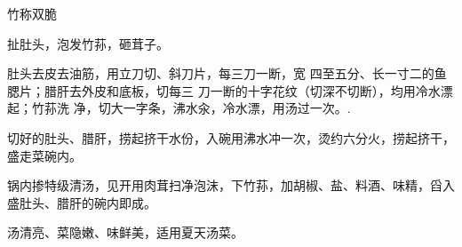 \begin{recipe}{竹称双脆}

\ingredients



\cooking

\step 扯肚头，泡发竹荪，砸茸子。

肚头去皮去油筋，用立刀切、斜刀片，每三刀一断，宽 四至五分、长一寸二的鱼腮片；腊肝去外皮和底板，切每三 刀一断的十字花纹（切深不切断），均用冷水漂起；竹荪洗 净，切大一字条，沸水汆，冷水漂，用汤过一次。.

\step 切好的肚头、腊肝，捞起挤干水份，入碗用沸水冲一次，烫约六分火，捞起挤干，盛走菜碗内。

\step 锅内掺特级清汤，见开用肉茸扫净泡沫，下竹荪，加胡椒、盐、料酒、味精，舀入盛肚头、腊肝的碗内即成。

\notes

汤清亮、菜隐嫩、味鲜美，适用夏天汤菜。

\end{recipe}

